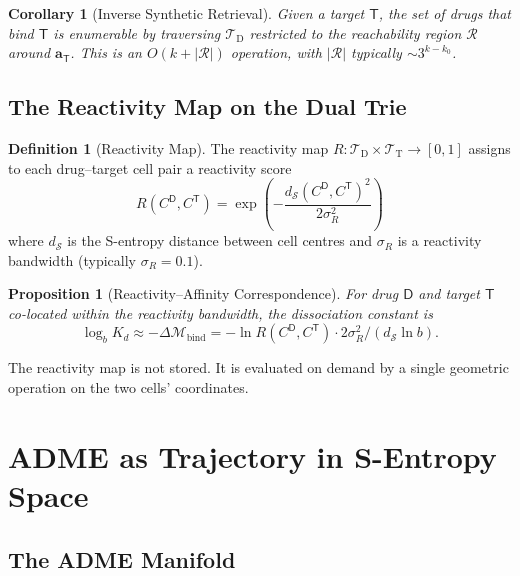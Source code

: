\documentclass[11pt,twocolumn,a4paper]{article}
\newtheorem{proposition}[theorem]{Proposition}
\newtheorem{corollary}[theorem]{Corollary}
\theoremstyle{definition}
\newtheorem{definition}[theorem]{Definition}
\theoremstyle{remark}
\newcommand{\Depth}{\mathcal{M}}
\newcommand{\Trie}{\mathcal{T}}
\newcommand{\Dtrie}{\Trie_{\mathrm{D}}}
\newcommand{\Ttrie}{\Trie_{\mathrm{T}}}
\newcommand{\Drug}{\mathsf{D}}
\newcommand{\Target}{\mathsf{T}}
\newcommand{\targaddr}{\mathbf{a}_\Target}
\begin{document}
\begin{corollary}[Inverse Synthetic Retrieval]
\label{cor:inverse_retrieval}
Given a target $\Target$, the set of drugs that bind $\Target$ is enumerable by traversing $\Dtrie$ restricted to the reachability region $\mathcal{R}$ around $\targaddr$. This is an $O(k + |\mathcal{R}|)$ operation, with $|\mathcal{R}|$ typically $\sim\!3^{k - k_0}$.
\end{corollary}

\subsection{The Reactivity Map on the Dual Trie}

\begin{definition}[Reactivity Map]
\label{def:reactivity}
The reactivity map $R: \Dtrie \times \Ttrie \to [0, 1]$ assigns to each drug--target cell pair a reactivity score
\begin{equation}
R(C^\Drug, C^\Target) = \exp\left(-\frac{d_{\mathcal{S}}(C^\Drug, C^\Target)^2}{2\sigma_R^2}\right)
\end{equation}
where $d_{\mathcal{S}}$ is the S-entropy distance between cell centres and $\sigma_R$ is a reactivity bandwidth (typically $\sigma_R = 0.1$).
\end{definition}

\begin{proposition}[Reactivity--Affinity Correspondence]
\label{prop:reactivity_kd}
For drug $\Drug$ and target $\Target$ co-located within the reactivity bandwidth, the dissociation constant is
\begin{equation}
\log_b K_d \approx -\Delta\Depth_{\mathrm{bind}} = -\ln R(C^\Drug, C^\Target) \cdot 2\sigma_R^2 / (d_{\mathcal{S}} \ln b).
\end{equation}
\end{proposition}

The reactivity map is not stored. It is evaluated on demand by a single geometric operation on the two cells' coordinates.

\section{ADME as Trajectory in S-Entropy Space}
\label{sec:adme}

\subsection{The ADME Manifold}
\end{document}
